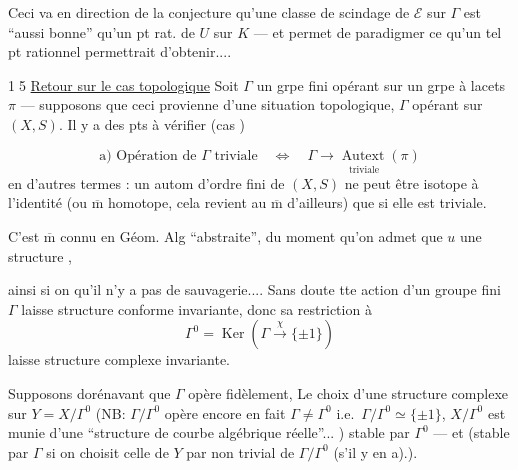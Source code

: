 
Ceci va en direction de la conjecture qu'une classe de scindage de $\mathcal E$ sur $\Gamma$ est ``aussi bonne'' qu'un pt rat. de $U$ sur $K$ --- et permet de paradigmer ce qu'un tel pt rationnel permettrait d'obtenir....

\textcircled{15} \uline{Retour sur le cas topologique} Soit $\Gamma$ un grpe fini opérant sur un grpe à lacets $\pi$ --- supposons que ceci provienne d'une situation topologique, $\Gamma$ opérant sur $(X,S)$. Il y a des pts à vérifier (cas \uline{})

\[
\text{a) Opération de }\Gamma\text{ triviale}
\quad\Longleftrightarrow\quad
\underset{\text{triviale}}{\Gamma\longrightarrow\operatorname{Autext}(\pi)}
\]
en d'autres termes : un autom d'ordre fini de $(X,S)$ ne peut être isotope à l'identité (ou $\overline{\mathrm m}$  homotope, cela revient au $\overline{\mathrm m}$ d'ailleurs) que si elle est triviale.

C'est $\overline{\mathrm m}$ connu en Géom. Alg ``abstraite'', du moment qu'on admet que $u$  une structure  ,  


ainsi si on   qu'il n'y a pas de sauvagerie.... Sans doute tte action d'un groupe fini $\Gamma$ laisse structure conforme invariante,  donc sa restriction à
\[
\Gamma^0=\operatorname{Ker}(\Gamma\xrightarrow{\chi}\{\pm1\})
\]
laisse structure complexe invariante.

Supposons dorénavant que $\Gamma$ opère fidèlement,   Le choix d'une structure complexe sur $Y=X/\Gamma^0$  (NB:  $\Gamma/\Gamma^0$ opère encore  en fait   $\Gamma\ne\Gamma^0$ i.e.\ $\Gamma/\Gamma^0\simeq\{\pm1\}$, $X/\Gamma^0$ est munie d'une ``structure de  courbe algébrique  réelle''... ) stable par $\Gamma^0$ --- et (stable par $\Gamma$ si on choisit celle de $Y$   par  non trivial de $\Gamma/\Gamma^0$ (s'il y en a).).

